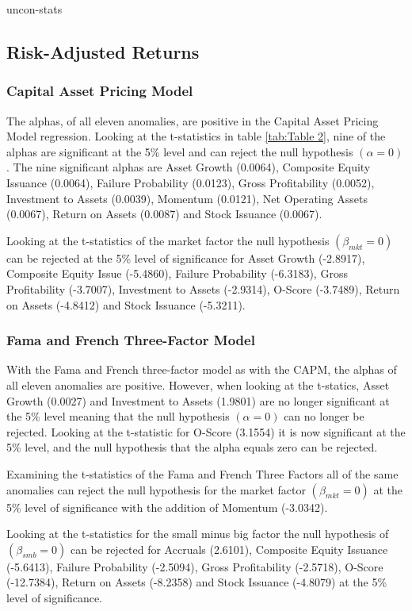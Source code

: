 \documentclass[a4paper,12pt]{article}                 %
\begin{document}
{uncon-stats}

\subsection{Risk-Adjusted Returns}
\subsubsection{Capital Asset Pricing Model}
The alphas, of all eleven anomalies, are positive in the Capital Asset Pricing Model regression. Looking at the t-statistics in table \ref{tab:Table 2}, nine of the alphas are significant at the 5\% level and can reject the null hypothesis $(\alpha=0)$. The nine significant alphas are Asset Growth (0.0064), Composite Equity Issuance (0.0064), Failure Probability (0.0123), Gross Profitability (0.0052), Investment to Assets (0.0039), Momentum (0.0121), Net Operating Assets (0.0067), Return on Assets (0.0087) and Stock Issuance (0.0067).

Looking at the t-statistics of the market factor the null hypothesis $(\beta_{mkt}= 0)$ can be rejected at the 5\% level of significance for Asset Growth (-2.8917), Composite Equity Issue (-5.4860), Failure Probability (-6.3183), Gross Profitability (-3.7007), Investment to Assets (-2.9314), O-Score (-3.7489), Return on Assets (-4.8412) and Stock Issuance (-5.3211). 

\subsubsection{Fama and French Three-Factor Model}
With the Fama and French three-factor model as with the CAPM, the alphas of all eleven anomalies are positive. However, when looking at the t-statics, Asset Growth (0.0027) and Investment to Assets (1.9801) are no longer significant at the 5\% level meaning that the null hypothesis $(\alpha=0)$ can no longer be rejected. Looking at the t-statistic for O-Score (3.1554) it is now significant at the 5\% level, and the null hypothesis that the alpha equals zero can be rejected. 

Examining the t-statistics of the Fama and French Three Factors all of the same anomalies can reject the null hypothesis for the market factor $(\beta_{mkt}= 0)$ at the 5\% level of significance with the addition of Momentum (-3.0342). 

Looking at the t-statistics for the small minus big factor the null hypothesis of $(\beta_{smb}= 0)$ can be rejected for Accruals (2.6101), Composite Equity Issuance (-5.6413), Failure Probability (-2.5094), Gross Profitability (-2.5718), O-Score (-12.7384), Return on Assets (-8.2358) and Stock Issuance (-4.8079) at the 5\% level of significance. 
\end{document}
